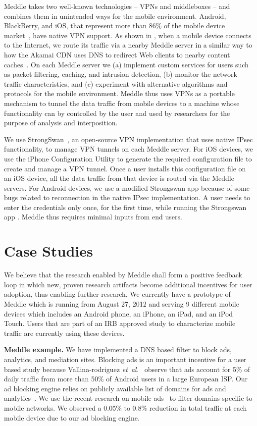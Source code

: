 \documentclass{sig-alternate-10pt}
\newcommand{\etal}{\emph{et~al.}}
\newcommand{\meddle}{{Meddle}\xspace}
\renewcommand{\fref}{\Fref}
\begin{document}
\meddle takes two well-known technologies -- VPNs and middleboxes --
and combines them in unintended ways for the mobile environment.
Android, BlackBerry, and iOS, that represent more than 86\% of the
mobile device market~\cite{gartner-phone-share}, have native VPN
support. As shown in \fref{fig:MeddleDeployment}, when a mobile device
connects to the Internet, we route its traffic via a nearby \meddle
server in a similar way to how the Akamai CDN uses DNS to redirect Web
clients to nearby content caches~\cite{akamai:cdn}. On each \meddle
server we (a) implement custom services for users such as packet
filtering, caching, and intrusion detection, (b) monitor the network
traffic characteristics, and (c) experiment with alternative
algorithms and protocols for the mobile environment. \meddle thus uses
VPNs as a portable mechanism to tunnel the data traffic from mobile
devices to a machine whose functionality can by controlled by the user
and used by researchers for the purpose of analysis and interposition.

We use StrongSwan~\cite{strongswan}, an open-source VPN implementation
that uses native IPsec functionality, to manage VPN tunnels on each
\meddle server. For iOS devices, we use the iPhone Configuration
Utility to generate the required configuration file to create and
manage a VPN tunnel. Once a user installs this configuration file on
an iOS device, all the data traffic from that device is routed via the 
\meddle servers. For Android devices, we use a modified Strongswan app
because of some bugs related to reconnection in the native IPsec
implementation. A user needs to enter the credentials only once, for
the first time, while running the Strongswan app . \meddle thus
requires minimal inputs from end users.    

\section{Case Studies}

We believe that the research enabled by \meddle shall form a positive
feedback loop in which new, proven research artifacts become
additional incentives for user adoption, thus enabling further
research. We currently have a prototype of \meddle which is running
from August 27, 2012 and serving 9 different mobile devices which
includes an Android phone, an iPhone, an iPad, and an iPod
Touch. Users that are part of an IRB approved study to characterize
mobile traffic are currently using these devices. 

\textbf{\meddle example.} We have implemented a DNS based filter to
block ads, analytics, and mediation sites. Blocking ads is an
important incentive for a user based study because Vallina-rodriguez
\etal~\cite{Vallina-rodriguez:2012:AdCache} observe that ads account
for 5\% of daily traffic from more than 50\% of Android users in a
large European ISP. Our ad blocking engine relies on publicly
available list of domains for ads and analytics~\cite{YoyoAds}. We use
the recent research on mobile ads~\cite{Leontiadis:2012:AdsMobile,
  hornyack:appfence} to filter domains specific to mobile
networks. We observed a 0.05\% to 0.8\% reduction in total traffic
at each mobile device due to our ad blocking engine. 
\end{document}
